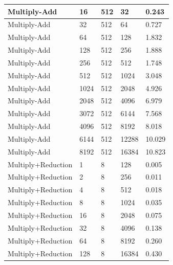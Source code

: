 \documentclass{article}
\begin{document}
\begin{longtable}{|l|l|l|l|l|}
Multiply-Add       & 16   & 512         & 32                & 0.243             \\ \hline
Multiply-Add       & 32   & 512         & 64                & 0.727             \\ \hline
Multiply-Add       & 64   & 512         & 128               & 1.832             \\ \hline
Multiply-Add       & 128  & 512         & 256               & 1.888             \\ \hline
Multiply-Add       & 256  & 512         & 512               & 1.748             \\ \hline
Multiply-Add       & 512  & 512         & 1024              & 3.048             \\ \hline
Multiply-Add       & 1024 & 512         & 2048              & 4.926             \\ \hline
Multiply-Add       & 2048 & 512         & 4096              & 6.979             \\ \hline
Multiply-Add       & 3072 & 512         & 6144              & 7.568             \\ \hline
Multiply-Add       & 4096 & 512         & 8192              & 8.018             \\ \hline
Multiply-Add       & 6144 & 512         & 12288             & 10.029            \\ \hline
Multiply-Add       & 8192 & 512         & 16384             & 10.823            \\ \hline
Multiply+Reduction & 1    & 8           & 128               & 0.005             \\ \hline
Multiply+Reduction & 2    & 8           & 256               & 0.011             \\ \hline
Multiply+Reduction & 4    & 8           & 512               & 0.018             \\ \hline
Multiply+Reduction & 8    & 8           & 1024              & 0.035             \\ \hline
Multiply+Reduction & 16   & 8           & 2048              & 0.075             \\ \hline
Multiply+Reduction & 32   & 8           & 4096              & 0.138             \\ \hline
Multiply+Reduction & 64   & 8           & 8192              & 0.260             \\ \hline
Multiply+Reduction & 128  & 8           & 16384             & 0.430             \\ \hline

\end{longtable}
\end{document}
